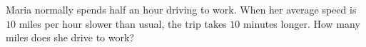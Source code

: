 Maria normally spends half an hour driving to work. When her average speed is $10$ miles per hour slower than usual, the trip takes $10$ minutes longer. How many miles does she drive to work?
